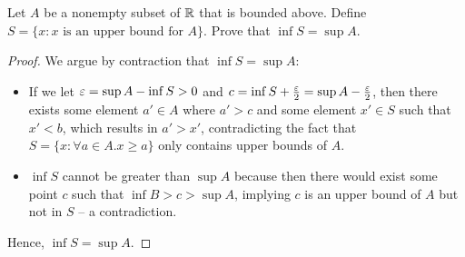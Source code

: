 \begin{problem}
  Let $A$ be a nonempty subset of $\mathbb{R}$ that is bounded above. Define 
  $S = \{ x : x \text{ is an upper bound for } A \}$. Prove that $\inf S = \sup A$.
\end{problem}

\begin{proof}
  We argue by contraction that $\inf S = \sup A$:
  \begin{itemize}
    \item If we let $\varepsilon = \sup A - \inf S > 0$ and $c = \inf S +
      \frac{\varepsilon}{2} = \sup A - \frac{\varepsilon}{2}$, then there exists some
      element $a' \in A$ where $a' > c$ and some element $x' \in S$ such that $x' < b$, which
      results in $a' > x'$, contradicting the fact that $S = \{ x : \forall a \in A. x \geq a \}$ 
      only contains upper bounds of $A$.
    \item $\inf S$ cannot be greater than $\sup A$ because then there would
      exist some point $c$ such that $\inf B > c > \sup A$, implying $c$ is an upper bound of $A$ 
      but not in $S$ -- a contradiction.
  \end{itemize}
  Hence, $\inf S = \sup A$.
\end{proof}
